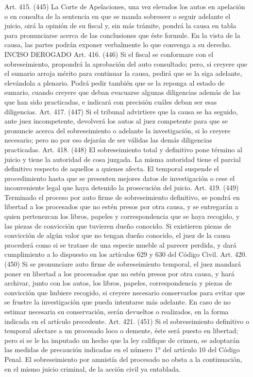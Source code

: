     Art. 415. (445) La Corte de Apelaciones, una vez elevados los autos en apelación o en consulta de la sentencia en que se manda sobreseer o seguir adelante el juicio, oirá la opinión de su fiscal y, sin más trámite, pondrá la causa en tabla para pronunciarse acerca de las conclusiones que éste formule.
    En la vista de la causa, las partes podrán exponer verbalmente lo que convenga a su derecho.
    INCISO DEROGADO
    Art. 416. (446) Si el fiscal se conformare con el sobreseimiento, propondrá la aprobación del auto consultado; pero, si creyere que el sumario arroja mérito para continuar la causa, pedirá que se la siga adelante, elevándola a plenario.
    Podrá pedir también que se la reponga al estado de sumario, cuando creyere que deban evacuarse algunas diligencias además de las que han sido practicadas, e indicará con precisión cuáles deban ser esas diligencias.
    Art. 417. (447) Si el tribunal advirtiere que la causa se ha seguido, ante juez incompetente, devolverá los autos al juez competente para que se pronuncie acerca del sobreseimiento o adelante la investigación, si lo creyere necesario; pero no por eso dejarán de ser válidas las demás diligencias practicadas.
    Art. 418. (448) El sobreseimiento total y definitivo pone término al juicio y tiene la autoridad de cosa juzgada.
    La misma autoridad tiene el parcial definitivo respecto de aquellos a quienes afecta.
    El temporal suspende el procedimiento hasta que se presenten mejores datos de investigación o cese el inconveniente legal que haya detenido la prosecución del juicio.
    Art. 419. (449) Terminado el proceso por auto firme de sobreseimiento definitivo, se pondrá en libertad a los procesados que no estén presos por otra causa, y se entregarán a quien pertenezcan los libros, papeles y correspondencia que se haya recogido, y las piezas de convicción que tuvieren dueño conocido.
    Si existieren piezas de convicción de algún valor que no tengan dueño conocido, el juez de la causa procederá como si se tratase de una especie mueble al parecer perdida, y dará cumplimiento a lo dispuesto en los artículos 629 y 630 del Código Civil.
    Art. 420. (450) Si se pronunciare auto firme de sobreseimiento temporal, el juez mandará poner en libertad a los procesados que no estén presos por otra causa, y hará archivar, junto con los autos, los libros, papeles, correspondencia y piezas de convicción que hubiere recogido, si creyere necesario conservarlos para evitar que se frustre la investigación que pueda intentarse más adelante.
    En caso de no estimar necesaria su conservación, serán devueltos o realizados, en la forma indicada en el artículo precedente.
    Art. 421. (451) Si el sobreseimiento definitivo o temporal afectare a un procesado loco o demente, éste será puesto en libertad; pero si se le ha imputado un hecho que la ley califique de crimen, se adoptarán las medidas de precaución indicadas en el número 1° del artículo 10 del Código Penal.
    El sobreseimiento por amnistía del procesado no obsta a la continuación, en el mismo juicio criminal, de la acción civil ya entablada.




